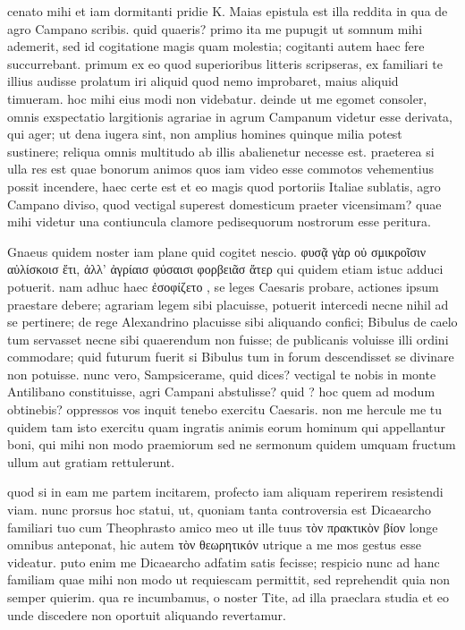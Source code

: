 


 cenato mihi et iam dormitanti pridie K. Maias epistula est illa reddita in qua de agro Campano scribis. quid quaeris? primo ita me pupugit ut somnum mihi ademerit, sed id cogitatione magis quam molestia; cogitanti autem haec fere succurrebant. primum ex eo quod superioribus litteris scripseras, ex familiari te illius audisse prolatum iri aliquid quod nemo improbaret, maius aliquid timueram. hoc mihi eius modi non videbatur. deinde ut me egomet consoler, omnis exspectatio largitionis agrariae in agrum Campanum videtur esse derivata, qui ager; ut dena iugera sint, non amplius homines quinque milia potest sustinere; reliqua omnis multitudo ab illis abalienetur necesse est. praeterea si ulla res est quae bonorum animos quos iam video esse commotos vehementius possit incendere, haec certe est et eo magis quod portoriis Italiae sublatis, agro Campano diviso, quod vectigal superest domesticum praeter vicensimam? quae mihi videtur una contiuncula clamore pedisequorum nostrorum esse peritura.

 Gnaeus quidem noster iam plane quid cogitet nescio. φυσᾷ γὰρ οὐ σμικροῖσιν αὐλίσκοισ ἔτι, ἀλλ' ἀγρίαισ φύσαισι φορβειᾶσ ἄτερ qui quidem etiam istuc adduci potuerit. nam adhuc haec ἐσοφίζετο , se leges Caesaris probare, actiones ipsum praestare debere; agrariam legem sibi placuisse, potuerit intercedi necne nihil ad se pertinere; de rege Alexandrino placuisse sibi aliquando confici; Bibulus de caelo tum servasset necne sibi quaerendum non fuisse; de publicanis voluisse illi ordini commodare; quid futurum fuerit si Bibulus tum in forum descendisset se divinare non potuisse. nunc vero, Sampsicerame, quid dices? vectigal te nobis in monte Antilibano constituisse, agri Campani abstulisse? quid ? hoc quem ad modum obtinebis? oppressos vos inquit tenebo exercitu Caesaris. non me hercule me tu quidem tam isto exercitu quam ingratis animis eorum hominum qui appellantur boni, qui mihi non modo praemiorum sed ne sermonum quidem umquam fructum ullum aut gratiam rettulerunt.

 quod si in eam me partem incitarem, profecto iam aliquam reperirem resistendi viam. nunc prorsus hoc statui, ut, quoniam tanta controversia est Dicaearcho familiari tuo cum Theophrasto amico meo ut ille tuus τὸν πρακτικὸν βίον longe omnibus anteponat, hic autem τὸν θεωρητικόν utrique a me mos gestus esse videatur. puto enim me Dicaearcho adfatim satis fecisse; respicio nunc ad hanc familiam quae mihi non modo ut requiescam permittit, sed reprehendit quia non semper quierim. qua re incumbamus, o noster Tite, ad illa praeclara studia et eo unde discedere non oportuit aliquando revertamur.


